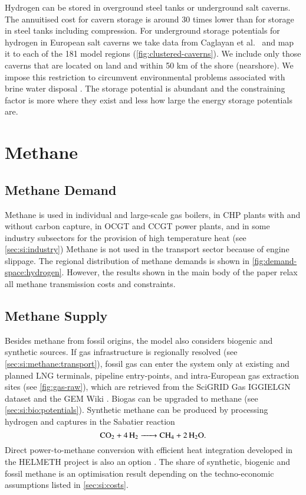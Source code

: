 Hydrogen can be stored in overground steel tanks or underground salt caverns.
The annuitised cost for cavern storage is around 30 times lower than for storage
in steel tanks including compression. For underground storage potentials for
hydrogen in European salt caverns we take data from Caglayan et
al.~ and map it to
each of the 181 model regions (\cref{fig:clustered-caverns}). We include only
those caverns that are located on land and within 50 km of the shore
(nearshore). We impose this restriction to circumvent environmental problems
associated with brine water disposal . The
storage potential is abundant and the constraining factor is more where they
exist and less how large the energy storage potentials are.

\section{Methane}
\label{sec:si:methane}

\subsection{Methane Demand}
\label{sec:si:methane:demand}

Methane is used in individual and large-scale gas boilers, in CHP plants with
and without carbon capture, in OCGT and CCGT power plants, and in some industry
subsectors for the provision of high temperature heat (see
\cref{sec:si:industry}) Methane is not used in the transport sector because of
engine slippage.  The regional distribution of methane demands is shown in
\cref{fig:demand-space:hydrogen}. However, the results shown in the main body of
the paper relax all methane transmission costs and constraints.

\subsection{Methane Supply}
\label{sec:si:methane:supply}

Besides methane from fossil origins, the model also considers biogenic and
synthetic sources. If gas infrastructure is regionally resolved (see
\cref{sec:si:methane:transport}), fossil gas can enter the system only at
existing and planned LNG terminals, pipeline entry-points, and intra-European
gas extraction sites (see \cref{fig:gas-raw}), which are retrieved from the
SciGRID Gas IGGIELGN dataset  and the GEM Wiki
\citeS{}. Biogas can be upgraded to methane (see \cref{sec:si:bio:potentials}).
Synthetic methane can be produced by processing hydrogen and captures \co in the
Sabatier reaction
\begin{equation}
    \ce{CO2 + 4H2 -> CH4 + 2H2O}.
\end{equation}
Direct power-to-methane conversion with efficient heat integration developed in
the HELMETH project is also an option . The
share of synthetic, biogenic and fossil methane is an optimisation result
depending on the techno-economic assumptions listed in \cref{sec:si:costs}.

